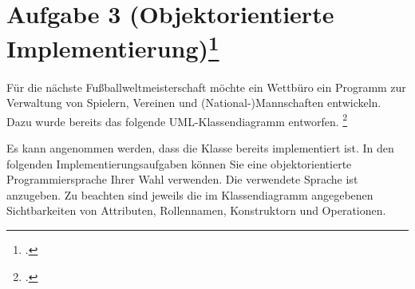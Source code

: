 \documentclass{lehramt-informatik-minimal}
\begin{document}
\section{Aufgabe 3 (Objektorientierte Implementierung)\footcite{oomup:pu:4}}

Für die nächste Fußballweltmeisterschaft möchte ein Wettbüro ein
Programm zur Verwaltung von Spielern, Vereinen und
(National-)Mannschaften entwickeln. Dazu wurde bereits das folgende
UML-Klassendiagramm entworfen.
\footcite[Thema 1 Teilaufgabe 1 Aufgabe 3]{examen:46116:2018:03}

\begin{center}
\end{center}

\noindent
Es kann angenommen werden, dass die Klasse  bereits
implementiert ist. In den folgenden Implementierungsaufgaben können Sie
eine objektorientierte Programmiersprache Ihrer Wahl verwenden. Die
verwendete Sprache ist anzugeben. Zu beachten sind jeweils die im
Klassendiagramm angegebenen Sichtbarkeiten von Attributen, Rollennamen,
Konstruktorn und Operationen.
\end{document}
